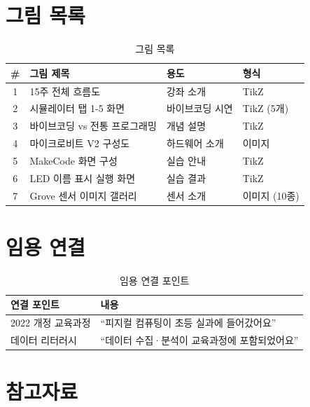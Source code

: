 \documentclass[11pt, a4paper]{article}
\begin{document}
\section{그림 목록}

\begin{table}[H]
\centering
\begin{tabularx}{\textwidth}{c X l l}
\toprule
\textbf{\#} & \textbf{그림 제목} & \textbf{용도} & \textbf{형식} \\
\midrule
1 & 15주 전체 흐름도 & 강좌 소개 & TikZ \\
2 & 시뮬레이터 탭 1-5 화면 & 바이브코딩 시연 & TikZ (5개) \\
3 & 바이브코딩 vs 전통 프로그래밍 & 개념 설명 & TikZ \\
4 & 마이크로비트 V2 구성도 & 하드웨어 소개 & 이미지 \\
5 & MakeCode 화면 구성 & 실습 안내 & TikZ \\
6 & LED 이름 표시 실행 화면 & 실습 결과 & TikZ \\
7 & Grove 센서 이미지 갤러리 & 센서 소개 & 이미지 (10종) \\
\bottomrule
\end{tabularx}
\caption{그림 목록}
\end{table}

\section{임용 연결}

\begin{table}[H]
\centering
\begin{tabularx}{\textwidth}{l X}
\toprule
\textbf{연결 포인트} & \textbf{내용} \\
\midrule
2022 개정 교육과정 & ``피지컬 컴퓨팅이 초등 실과에 들어갔어요'' \\
데이터 리터러시 & ``데이터 수집·분석이 교육과정에 포함되었어요'' \\
\bottomrule
\end{tabularx}
\caption{임용 연결 포인트}
\end{table}

\section*{참고자료}
\end{document}
